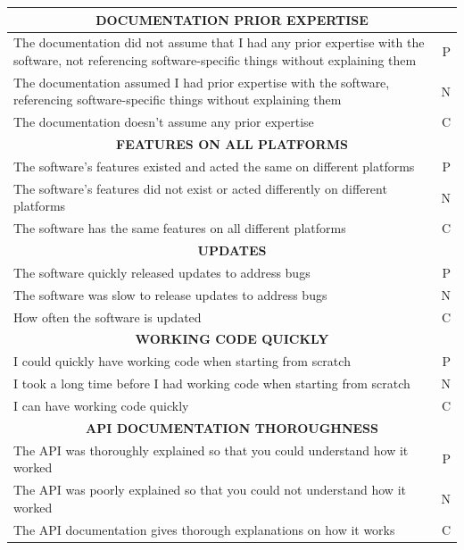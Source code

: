 \documentclass{article}
\begin{document}
\begin{table}[H]
\centering
\begin{tabularx}{\columnwidth}{X|r} \hline \hline
\multicolumn{2}{c}{\textbf{	DOCUMENTATION PRIOR EXPERTISE	}} \\ \hline
The documentation did not assume that I had any prior expertise with the software, not referencing software-specific things without explaining them	&	P		\\ \hline
The documentation assumed I had prior expertise with the software, referencing software-specific things without explaining them	&	N		\\ \hline
The documentation doesn't assume any prior expertise	&	C \\ \hline \hline
\multicolumn{2}{c}{\textbf{	FEATURES ON ALL PLATFORMS	}} \\ \hline
The software's features existed and acted the same on different platforms	&	P		\\ \hline
The software's features did not exist or acted differently on different platforms	&	N		\\ \hline
The software has the same features on all different platforms	&	C		\\ \hline \hline
\multicolumn{2}{c}{\textbf{	UPDATES	}} \\ \hline
The software quickly released updates to address bugs	&	P		\\ \hline
The software was slow to release updates to address bugs	&	N		\\ \hline
How often the software is updated	&	C		\\ \hline \hline
\multicolumn{2}{c}{\textbf{	WORKING CODE QUICKLY	}} \\ \hline
I could quickly have working code when starting from scratch	&	P		\\ \hline
I took a long time before I had working code when starting from scratch	&	N		\\ \hline
I can have working code quickly	&	C		\\ \hline \hline
\multicolumn{2}{c}{\textbf{	API DOCUMENTATION THOROUGHNESS	}} \\ \hline
The API was thoroughly explained so that you could understand how it worked	&	P		\\ \hline
The API was poorly explained so that you could not understand how it worked	&	N		\\ \hline
The API documentation gives thorough explanations on how it works	&	C		\\ \hline \hline

\end{tabularx}
\end{table}
\end{document}
